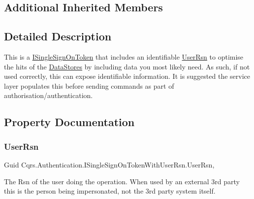 \subsection*{Additional Inherited Members}


\subsection{Detailed Description}
This is a \hyperlink{interfaceCqrs_1_1Authentication_1_1ISingleSignOnToken}{I\+Single\+Sign\+On\+Token} that includes an identifiable \hyperlink{interfaceCqrs_1_1Authentication_1_1ISingleSignOnTokenWithUserRsn_a3ba8dbde50e032ebc76c96a5ff40f47f}{User\+Rsn} to optimise the hits of the \hyperlink{}{Data\+Stores} by including data you most likely need. As such, if not used correctly, this can expose identifiable information. It is suggested the service layer populates this before sending commands as part of authorisation/authentication. 



\subsection{Property Documentation}
\mbox{\label{interfaceCqrs_1_1Authentication_1_1ISingleSignOnTokenWithUserRsn_a3ba8dbde50e032ebc76c96a5ff40f47f}} 
\subsubsection{\texorpdfstring{User\+Rsn}{UserRsn}}
{\footnotesize\ttfamily Guid Cqrs.\+Authentication.\+I\+Single\+Sign\+On\+Token\+With\+User\+Rsn.\+User\+Rsn\hspace{0.3cm}{\ttfamily [get]}, {\ttfamily [set]}}



The Rsn of the user doing the operation. When used by an external 3rd party this is the person being impersonated, not the 3rd party system itself. 

